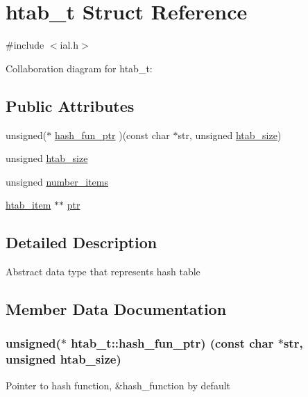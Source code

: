 \hypertarget{structhtab__t}{}\section{htab\+\_\+t Struct Reference}
\label{structhtab__t}


{\ttfamily \#include $<$ial.\+h$>$}



Collaboration diagram for htab\+\_\+t\+:
\subsection*{Public Attributes}
\begin{DoxyCompactItemize}
\item 
unsigned($\ast$ \hyperlink{structhtab__t_adeb6903d98e803769a5d9f5600f2878f}{hash\+\_\+fun\+\_\+ptr} )(const char $\ast$str, unsigned \hyperlink{structhtab__t_a2565e30da8192e773408aa47e9c69b9c}{htab\+\_\+size})
\item 
unsigned \hyperlink{structhtab__t_a2565e30da8192e773408aa47e9c69b9c}{htab\+\_\+size}
\item 
unsigned \hyperlink{structhtab__t_a42e08f3235d283aa7a4bd4ce715083f6}{number\+\_\+items}
\item 
\hyperlink{structhtab__item}{htab\+\_\+item} $\ast$$\ast$ \hyperlink{structhtab__t_a690071ddbcc17c986b7eb600d925a1dd}{ptr}
\end{DoxyCompactItemize}


\subsection{Detailed Description}
Abstract data type that represents hash table 

\subsection{Member Data Documentation}
\subsubsection[{\texorpdfstring{hash\+\_\+fun\+\_\+ptr}{hash_fun_ptr}}]{\setlength{\rightskip}{0pt plus 5cm}unsigned($\ast$ htab\+\_\+t\+::hash\+\_\+fun\+\_\+ptr) (const char $\ast$str, unsigned {\bf htab\+\_\+size})}\hypertarget{structhtab__t_adeb6903d98e803769a5d9f5600f2878f}{}\label{structhtab__t_adeb6903d98e803769a5d9f5600f2878f}
Pointer to hash function, \&hash\+\_\+function by default 
